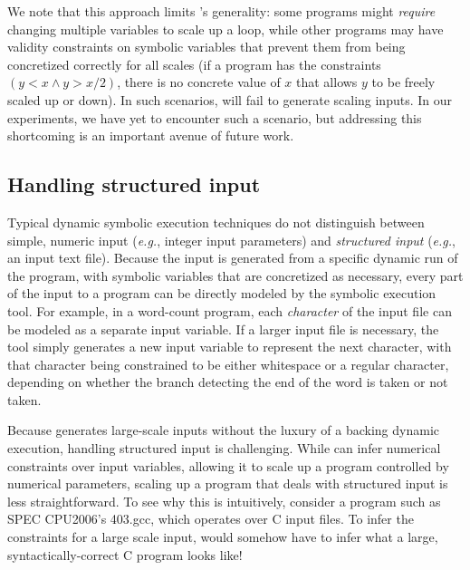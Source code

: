We note that this approach limits \lancet's generality: some programs might
{\em require} changing multiple variables to scale up a loop, while other
programs may have validity constraints on symbolic variables that prevent them
from being concretized correctly for all scales (\eg if a program has
the constraints $(y < x \land y > x/2)$, there is no concrete value of $x$
that allows $y$ to be freely scaled up or down). In such scenarios, \lancet
will fail to generate scaling inputs. In our experiments, we have yet to
encounter such a scenario, but addressing this shortcoming is an important
avenue of future work.

\subsection{Handling structured input}
\label{sec:structured}


Typical dynamic symbolic execution techniques do not distinguish between
simple, numeric input ({\em e.g.}, integer input parameters) and {\em
structured input} ({\em e.g.}, an input text file). Because the input is
generated from a specific dynamic run of the program, with symbolic variables
that are concretized as necessary, every part of the input to a program can
be directly modeled by the symbolic execution tool. For example, in a
word-count program, each {\em character} of the input file can be modeled as a
separate input variable. If a larger input file is necessary, the tool simply
generates a new input variable to represent the next character, with that
character being constrained to be either whitespace or a regular character,
depending on whether the branch detecting the end of the word is taken or not
taken.

Because \lancet generates large-scale inputs without the luxury of a backing
dynamic execution, handling structured input is challenging. While \lancet can
infer numerical constraints over input variables, allowing it to scale up a
program controlled by numerical parameters, scaling up a program that deals
with structured input is less straightforward. To see why this is intuitively,
consider a program such as SPEC CPU2006's 403.gcc, which operates over C input
files. To infer the constraints for a large scale input, \lancet would somehow
have to infer what a large, syntactically-correct C program looks like!


